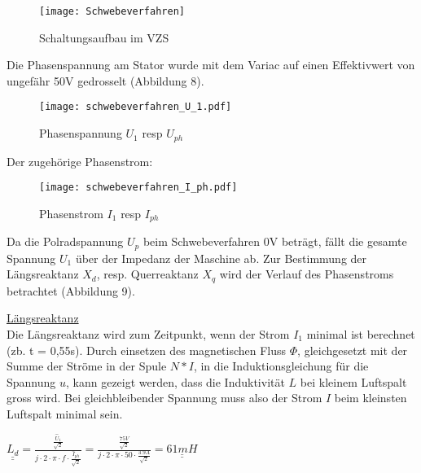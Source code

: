 \begin{flushleft}
 \begin{figure}[H]
    \centering
        \texttt{[image: Schwebeverfahren]}
    \caption{Schaltungsaufbau im VZS}
    \label{fig:abb1}
\end{figure}


Die Phasenspannung am Stator wurde mit dem Variac auf einen Effektivwert von ungefähr 50V gedrosselt (Abbildung 8). 


\begin{figure}[H]
    \centering
        \texttt{[image: schwebeverfahren\_U\_1.pdf]}
    \caption{Phasenspannung $U_1$ resp $U_{ph}$}
    \label{fig:abb1}
\end{figure}


\newpage

Der zugehörige Phasenstrom:\\
\vspace{0.3cm}
\begin{figure}[H]
    \centering
        \texttt{[image: schwebeverfahren\_I\_ph.pdf]}
    \caption{Phasenstrom $I_1$ resp $I_{ph}$}
    \label{fig:abb1}
\end{figure}


Da die Polradspannung $U_p$ beim Schwebeverfahren 0V beträgt, fällt die gesamte Spannung $U_1$ über der Impedanz der Maschine ab. 
Zur Bestimmung der Längsreaktanz $X_d$, resp. Querreaktanz $X_q$ wird der Verlauf des Phasenstroms betrachtet (Abbildung 9).\\
\vspace{0.4cm}

\underline{Längsreaktanz}\\
\vspace{0.2cm}
Die Längsreaktanz wird zum Zeitpunkt, wenn der Strom $I_1$ minimal ist  berechnet (zb. t = 0,55s). 
Durch einsetzen des magnetischen Fluss $\Phi$, gleichgesetzt mit der Summe der Ströme in der Spule $N*I$, in die Induktionsgleichung für die Spannung $u$, kann gezeigt werden, dass die Induktivität $L$ bei kleinem Luftspalt gross wird. Bei gleichbleibender Spannung muss also der Strom $I$ beim kleinsten Luftspalt minimal sein. 


\begin{center}
\begin{Large}
$ \underline{\underline{L_d}}= \frac{\frac{\hat{U}_1}{\sqrt{2}}}{j \cdot 2 \cdot \pi \cdot f \cdot \frac{\hat{I}_{ph}}{\sqrt{2}} }  = \frac{\frac{75 V}{\sqrt{2}}}{j \cdot 2 \cdot \pi \cdot 50 \cdot \frac{3.9 A}{\sqrt{2}} } = \underline{\underline{61 mH}}$\\
\end{Large}
\end{center}



\end{flushleft}
